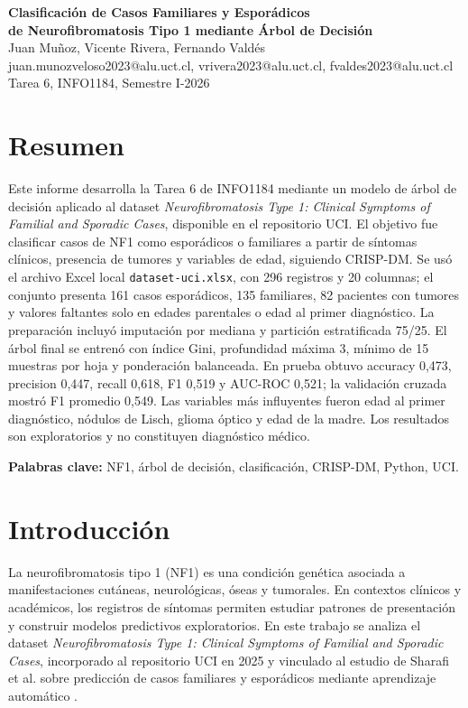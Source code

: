 \documentclass[10pt,a4paper]{article}
\begin{document}
\begin{center}
  {\LARGE \textbf{Clasificación de Casos Familiares y Esporádicos}} \\[3pt]
  {\LARGE \textbf{de Neurofibromatosis Tipo 1 mediante Árbol de Decisión}} \\[8pt]
  {\normalsize Juan Muñoz, Vicente Rivera, Fernando Valdés} \\[2pt]
  {\small juan.munozveloso2023@alu.uct.cl, vrivera2023@alu.uct.cl, fvaldes2023@alu.uct.cl} \\[2pt]
  {\small Tarea 6, INFO1184, Semestre I-2026}
\end{center}

\section*{Resumen}

Este informe desarrolla la Tarea 6 de INFO1184 mediante un modelo de árbol de decisión aplicado al dataset \textit{Neurofibromatosis Type 1: Clinical Symptoms of Familial and Sporadic Cases}, disponible en el repositorio UCI. El objetivo fue clasificar casos de NF1 como esporádicos o familiares a partir de síntomas clínicos, presencia de tumores y variables de edad, siguiendo CRISP-DM. Se usó el archivo Excel local \texttt{dataset-uci.xlsx}, con 296 registros y 20 columnas; el conjunto presenta 161 casos esporádicos, 135 familiares, 82 pacientes con tumores y valores faltantes solo en edades parentales o edad al primer diagnóstico. La preparación incluyó imputación por mediana y partición estratificada 75/25. El árbol final se entrenó con índice Gini, profundidad máxima 3, mínimo de 15 muestras por hoja y ponderación balanceada. En prueba obtuvo accuracy 0,473, precision 0,447, recall 0,618, F1 0,519 y AUC-ROC 0,521; la validación cruzada mostró F1 promedio 0,549. Las variables más influyentes fueron edad al primer diagnóstico, nódulos de Lisch, glioma óptico y edad de la madre. Los resultados son exploratorios y no constituyen diagnóstico médico.

\textbf{Palabras clave:} NF1, árbol de decisión, clasificación, CRISP-DM, Python, UCI.

\section{Introducción}

La neurofibromatosis tipo 1 (NF1) es una condición genética asociada a manifestaciones cutáneas, neurológicas, óseas y tumorales. En contextos clínicos y académicos, los registros de síntomas permiten estudiar patrones de presentación y construir modelos predictivos exploratorios. En este trabajo se analiza el dataset \textit{Neurofibromatosis Type 1: Clinical Symptoms of Familial and Sporadic Cases}, incorporado al repositorio UCI en 2025 y vinculado al estudio de Sharafi et al. sobre predicción de casos familiares y esporádicos mediante aprendizaje automático \citep{uci2025nf1,sharafi2025nf1}.
\end{document}
